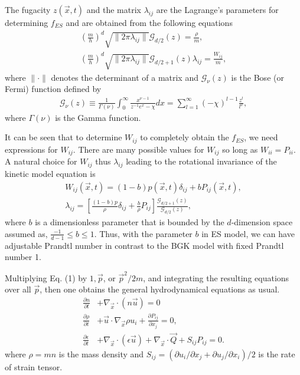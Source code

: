 \documentclass[doublecol]{epl2}
\begin{document}
The fugacity $z(\vec x,t)$ and the matrix $\lambda_{i j}$ are the Lagrange's parameters for determining $f_{ES}$ and are obtained from the following equations
\begin{align}
\left(\frac{m}{h}\right)^d \sqrt{ \|2 \pi \lambda_{i j}\| } \mathcal{G}_{d/2}(z) = \frac{\rho}{m}, \\
\left(\frac{m}{h}\right)^d \sqrt{ \|2 \pi \lambda_{i j}\| } \mathcal{G}_{d/2 +1}(z) \lambda_{i j} = \frac{W_{i j}}{m},
\end{align}
where $\| \cdot \|$ denotes the determinant of a matrix and $\mathcal{G}_{\nu}(z)$ is the Bose (or Fermi) function defined by
\begin{align}
\mathcal{G}_{\nu}(z) \equiv \frac{1}{\Gamma(\nu)} \int^{\infty}_0 \frac{ x^{\nu
-1} }{ {z^{-1} e^x - \chi}}dx = \sum^{\infty}_{l=1}
(-\chi)^{l-1} \frac{z^l}{l^{\nu}},
\end{align}
where $\Gamma(\nu)$ is the Gamma function.

It can be seen that to determine $W_{i j} $ to completely obtain the $f_{ES}$, we need expressions for $W_{i j}$.   There are many possible values for $W_{i j}$ so long as $W_{i i}=P_{i i}$.   A natural choice for $W_{ij}$ thus $\lambda_{i j}$ leading to the rotational invariance of the kinetic model equation is \cite{Holway1966}
\begin{align}
W_{i j}(\vec x, t) = (1 - b) p(\vec x, t) \delta_{i j} + b P_{i j}(\vec x, t), \\
\lambda_{i j} = \left[\frac{(1-b)p}{\rho} \delta_{i j}+ \frac{b}{\rho}P_{i j } \right] \frac{\mathcal{G}_{d/2+1}(z)}{\mathcal{G}_{d/2}(z)},
\end{align}
where $b$ is a dimensionless parameter that is bounded by the $d$-dimension space assumed as, $\frac{-1}{d-1} \le b \le 1$.  Thus, with the parameter $b$ in ES model, we can have adjustable Prandtl number in contrast to the BGK model with fixed Prandtl number 1.

Multiplying Eq. (1) by $1, \vec p$, or $\vec p^2/2m$, and integrating the resulting equations over all $\vec p$, then one obtains the general hydrodynamical equations as usual.
\begin{align}
\frac{\partial n}{\partial t} &+ \nabla_{\vec x} \cdot (n \vec u) = 0 \\
\frac{\partial \rho}{\partial t} &+ \vec u \cdot \nabla_{\vec x} \rho u_{i} + \frac{\partial P_{ij}}{\partial x_{j} } = 0, \\
\frac{\partial \epsilon}{\partial t} &+ \nabla_{\vec x} \cdot (\epsilon \vec u) + \nabla_{\vec x} \cdot \vec Q + S_{ij} P_{ij} = 0.
\end{align}
where $\rho=m n$ is the mass density and $S_{ij}=(\partial u_{i}/\partial x_{j} + \partial u_{j}/\partial x_{i})/2$ is the rate of strain tensor.
\end{document}
